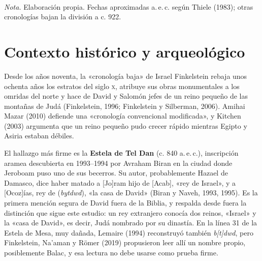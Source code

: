 \begin{center}
\\[2pt]
{\footnotesize\color{sepia}\textit{Nota.} Elaboración propia. Fechas aproximadas a.\,e.\,c. según Thiele (1983); otras cronologías bajan la división a c. 922.}
\end{center}

\section{Contexto histórico y arqueológico}

Desde los años noventa, la «cronología baja» de Israel Finkelstein rebaja unos ochenta años los estratos del siglo \textsc{x}, atribuye sus obras monumentales a los omridas del norte y hace de David y Salomón jefes de un reino pequeño de las montañas de Judá (Finkelstein, 1996; Finkelstein y Silberman, 2006). Amihai Mazar (2010) defiende una «cronología convencional modificada», y Kitchen (2003) argumenta que un reino pequeño pudo crecer rápido mientras Egipto y Asiria estaban débiles.

El hallazgo más firme es la \textbf{Estela de Tel Dan} (c. 840 a.\,e.\,c.), inscripción aramea descubierta en 1993--1994 por Avraham Biran en la ciudad donde Jeroboam puso uno de sus becerros. Su autor, probablemente Hazael de Damasco, dice haber matado a [Jo]ram hijo de [Acab], «rey de Israel», y a [Ocoz]ías, rey de  (\emph{bytdwd}), «la casa de David» (Biran y Naveh, 1993, 1995). Es la primera mención segura de David fuera de la Biblia, y respalda desde fuera la distinción que sigue este estudio: un rey extranjero conocía dos reinos, «Israel» y la «casa de David», es decir, Judá nombrado por su dinastía. En la línea 31 de la Estela de Mesa, muy dañada, Lemaire (1994) reconstruyó también \emph{b[t]dwd}, pero Finkelstein, Na'aman y Römer (2019) propusieron leer allí un nombre propio, posiblemente Balac, y esa lectura no debe usarse como prueba firme.

